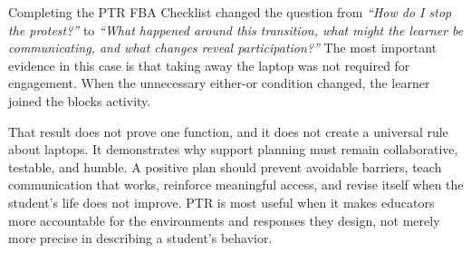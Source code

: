 \documentclass[11pt]{article}
\begin{document}
Completing the PTR FBA Checklist changed the question from \textit{``How do I stop the protest?''} to \textit{``What happened around this transition, what might the learner be communicating, and what changes reveal participation?''} The most important evidence in this case is that taking away the laptop was not required for engagement. When the unnecessary either-or condition changed, the learner joined the blocks activity.

That result does not prove one function, and it does not create a universal rule about laptops. It demonstrates why support planning must remain collaborative, testable, and humble. A positive plan should prevent avoidable barriers, teach communication that works, reinforce meaningful access, and revise itself when the student's life does not improve. PTR is most useful when it makes educators more accountable for the environments and responses they design, not merely more precise in describing a student's behavior.

\small

\end{document}
